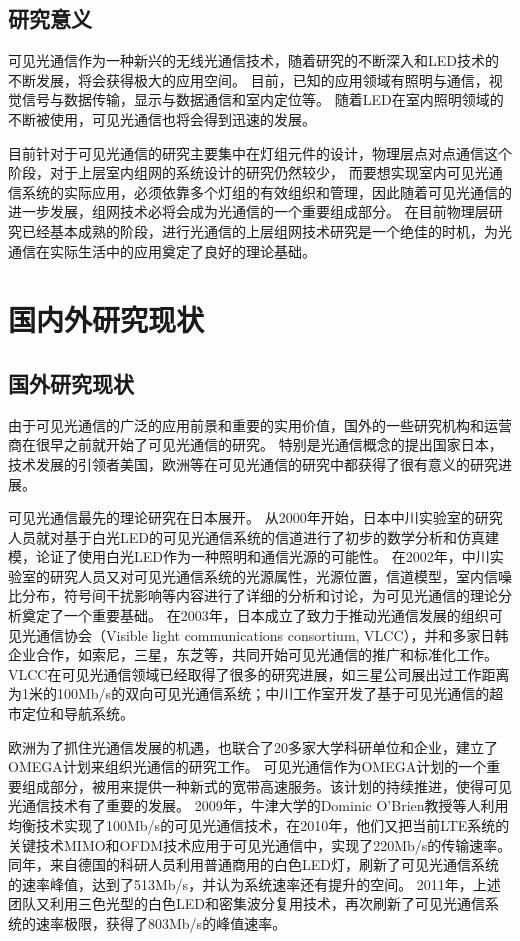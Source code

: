 \subsection{研究意义}
可见光通信作为一种新兴的无线光通信技术，随着研究的不断深入和LED技术的不断发展，将会获得极大的应用空间。
目前，已知的应用领域有照明与通信，视觉信号与数据传输，显示与数据通信和室内定位等\cite{XueXiaoMan2014}。
随着LED在室内照明领域的不断被使用，可见光通信也将会得到迅速的发展。

目前针对于可见光通信的研究主要集中在灯组元件的设计，物理层点对点通信这个阶段，对于上层室内组网的系统设计的研究仍然较少\cite{HuangZT2012}，
而要想实现室内可见光通信系统的实际应用，必须依靠多个灯组的有效组织和管理，因此随着可见光通信的进一步发展，组网技术必将会成为光通信的一个重要组成部分。
在目前物理层研究已经基本成熟的阶段，进行光通信的上层组网技术研究是一个绝佳的时机，为光通信在实际生活中的应用奠定了良好的理论基础。

\section{国内外研究现状}\label{sec:stage}
\subsection{国外研究现状}
由于可见光通信的广泛的应用前景和重要的实用价值，国外的一些研究机构和运营商在很早之前就开始了可见光通信的研究。
特别是光通信概念的提出国家日本，技术发展的引领者美国，欧洲等在可见光通信的研究中都获得了很有意义的研究进展。

可见光通信最先的理论研究在日本展开。
从2000年开始，日本中川实验室的研究人员就对基于白光LED的可见光通信系统的信道进行了初步的数学分析和仿真建模，论证了使用白光LED作为一种照明和通信光源的可能性\cite{Tanaka2000}。
在2002年，中川实验室的研究人员又对可见光通信系统的光源属性，光源位置，信道模型，室内信噪比分布，符号间干扰影响等内容进行了详细的分析和讨论，为可见光通信的理论分析奠定了一个重要基础\cite{KomineT2004}。
在2003年，日本成立了致力于推动光通信发展的组织可见光通信协会（Visible light communications consortium, VLCC），并和多家日韩企业合作，如索尼，三星，东芝等，共同开始可见光通信的推广和标准化工作\cite{VLCC}。
VLCC在可见光通信领域已经取得了很多的研究进展，如三星公司展出过工作距离为1米的100Mb/s的双向可见光通信系统；中川工作室开发了基于可见光通信的超市定位和导航系统\cite{VLCC}。

欧洲为了抓住光通信发展的机遇，也联合了20多家大学科研单位和企业，建立了OMEGA计划来组织光通信的研究工作\cite{OMEGA}。
可见光通信作为OMEGA计划的一个重要组成部分，被用来提供一种新式的宽带高速服务。该计划的持续推进，使得可见光通信技术有了重要的发展。
2009年，牛津大学的Dominic O'Brien教授等人利用均衡技术实现了100Mb/s的可见光通信技术\cite{le2009}，在2010年，他们又把当前LTE系统的关键技术MIMO和OFDM技术应用于可见光通信中，实现了220Mb/s的传输速率\cite{azhar2010}。
同年，来自德国的科研人员利用普通商用的白色LED灯，刷新了可见光通信系统的速率峰值，达到了513Mb/s，并认为系统速率还有提升的空间\cite{vuvcic2010}。
2011年，上述团队又利用三色光型的白色LED和密集波分复用技术，再次刷新了可见光通信系统的速率极限，获得了803Mb/s的峰值速率\cite{vucic2011}。


